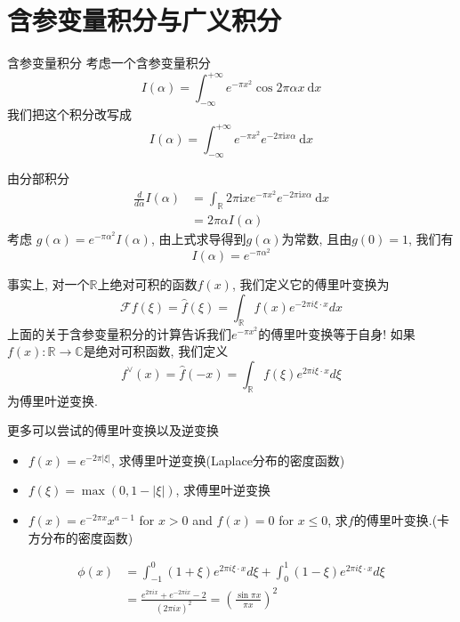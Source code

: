 \documentclass{beamer}
\theoremstyle{definition}
\newcommand{\bb}[1]{\mathbb{#1}}
\begin{document}
\section{含参变量积分与广义积分}
\begin{frame}{含参变量积分}
    考虑一个含参变量积分
    \begin{equation*}
        I(\alpha)=\int_{-\infty}^{+\infty} e^{-\pi x^2} \cos 2\pi\alpha x \mathrm{~d} x
    \end{equation*}
    我们把这个积分改写成
    \begin{equation*}
        I(\alpha)=\int_{-\infty}^{+\infty} e^{-\pi x^2} e^{-2\pi \text{i}x\alpha}\mathrm{~d} x
    \end{equation*}
\end{frame}
\begin{frame}
    由分部积分
    \begin{align*}
        \frac{d}{d\alpha}I(\alpha) & =\int_{\bb{R}} 2\pi\text{i}xe^{-\pi x^2}e^{-2\pi \text{i}x\alpha}\mathrm{~d} x \\
                                   & =2\pi \alpha I(\alpha)
    \end{align*}
    考虑 $g(\alpha)=e^{-\pi \alpha^2}I(\alpha)$,
    由上式求导得到$g(\alpha)$为常数, 且由$g(0)=1$,  我们有
    \begin{equation*}
        I(\alpha)=e^{-\pi\alpha^2}
    \end{equation*}
\end{frame}
\begin{frame}
    事实上, 对一个$\bb{R}$上绝对可积的函数$f(x)$, 我们定义它的傅里叶变换为
    \begin{equation*}
        \mathcal{F} f(\xi)=\widehat{f}(\xi)=\int_{\mathbb{R}} f(x) e^{-2 \pi i \xi \cdot x} d x
    \end{equation*}
    上面的关于含参变量积分的计算告诉我们$e^{-\pi x^2}$的傅里叶变换等于自身!
    如果$f(x):\bb{R}\rightarrow \bb{C}$是绝对可积函数, 我们定义
    $$
        f^{\vee}(x)=\widehat{f}(-x)=\int_{\bb{R}} f(\xi) e^{2 \pi i \xi \cdot x} d \xi
    $$
    为傅里叶逆变换.
\end{frame}
\begin{frame}
    更多可以尝试的傅里叶变换以及逆变换
    \begin{itemize}
        \item $f(x)=e^{-2\pi|\xi|}$, 求傅里叶逆变换(Laplace分布的密度函数)
        \item $f(\xi)=\max(0,1-|\xi|)$, 求傅里叶逆变换
        \item $f(x)=e^{-2 \pi x} x^{a-1}$ for $x>0$ and $f(x)=0$ for $x \leq 0$, 求$f$的傅里叶变换.(卡方分布的密度函数)
    \end{itemize}
    $$
        \begin{aligned}
            \phi(x) & =\int_{-1}^0(1+\xi) e^{2 \pi i \xi \cdot x} d \xi+\int_0^1(1-\xi) e^{2 \pi i \xi \cdot x} d \xi \\
                    & =\frac{e^{2 \pi i x}+e^{-2 \pi i x}-2}{(2 \pi i x)^2}=\left(\frac{\sin \pi x}{\pi x}\right)^2
        \end{aligned}
    $$
\end{frame}
\end{document}
